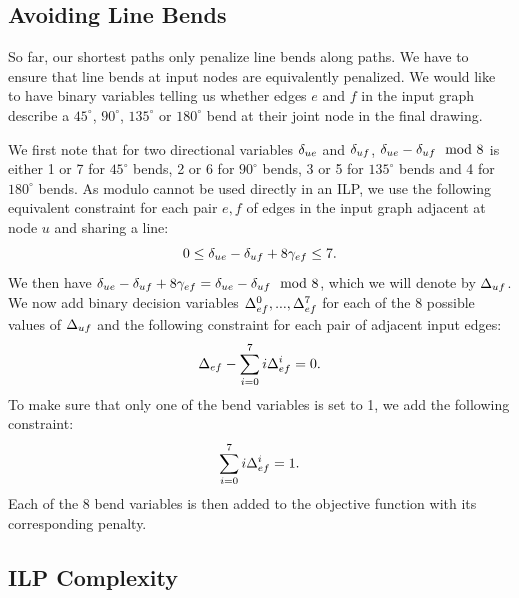 \documentclass{sig-alternate-sigmod09}
\begin{document}
\subsection{Avoiding Line Bends}

So far, our shortest paths only penalize line bends along paths.
We have to ensure that line bends at input nodes are equivalently penalized.
We would like to have binary variables telling us whether edges $e$ and $f$ in the input graph describe a $45^{\circ}$, $90^{\circ}$, $135^{\circ}$ or $180^{\circ}$ bend at their joint node in the final drawing.

We first note that for two directional variables $\delta_{ue}$ and $\delta_{uf}$, $\delta_{ue} - \delta_{uf} \mod 8$ is either 1 or 7 for $45^\circ$ bends, 2 or 6 for $90^\circ$ bends, 3 or 5 for $135^\circ$ bends and 4 for $180^\circ$ bends.
As modulo cannot be used directly in an ILP, we use the following equivalent constraint for each pair $e, f$ of edges in the input graph adjacent at node $u$ and sharing a line:
%
\begin{equation} 
  0 \leq \delta_{ue} - \delta_{uf} + 8 \gamma_{ef} \leq 7 \label{EQ:dirneg}.
\end{equation}
%
We then have $\delta_{ue} - \delta_{uf} + 8 \gamma_{ef} = \delta_{ue} - \delta_{uf} \mod 8$, which we will denote by $\Delta_{uf}$.
We now add binary decision variables $\Delta_{ef}^{0}, ..., \Delta_{ef}^{7}$ for each of the 8 possible values of $\Delta_{uf}$ and the following constraint for each pair of adjacent input edges:
%
\begin{equation} 
  \Delta_{ef} - \sum_{i = 0}^7 i\Delta_{ef}^{i} = 0 \label{EQ:bendassign}.
\end{equation}
%
To make sure that only one of the bend variables is set to 1, we add the following constraint:
%
\begin{equation} 
  \sum_{i = 0}^7 i\Delta_{ef}^{i} = 1 \label{EQ:bendsum}.
\end{equation}
%
Each of the 8 bend variables is then added to the objective function with its corresponding penalty.

\subsection{ILP Complexity}
\end{document}
